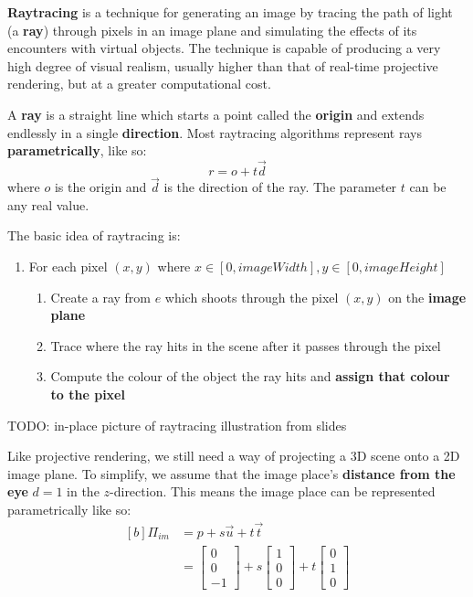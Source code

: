 \documentclass{article}
\begin{document}
\textbf{Raytracing} is a technique for generating an image by tracing the path of light (a \textbf{ray}) through pixels in an image plane and simulating the effects of its encounters with virtual objects. The technique is capable of producing a very high degree of visual realism, usually higher than that of real-time projective rendering, but at a greater computational cost.

A \textbf{ray} is a straight line which starts a point called the \textbf{origin} and extends endlessly in a single \textbf{direction}. Most raytracing algorithms represent rays \textbf{parametrically}, like so:
\begin{equation}
	r = o + t\vec{d}
	\label{eq:parametric-ray}
\end{equation}
where $o$ is the origin and $\vec{d}$ is the direction of the ray. The parameter $t$ can be any real value.

The basic idea of raytracing is:
\begin{enumerate}
	\item For each pixel $(x, y)$ where $x \in [0, imageWidth], y \in [0, imageHeight]$
	\begin{enumerate}
		\item Create a ray from $e$ which shoots through the pixel $(x, y)$ on the \textbf{image plane}
		\item Trace where the ray hits in the scene after it passes through the pixel
		\item Compute the colour of the object the ray hits and \textbf{assign that colour to the pixel}
	\end{enumerate}
\end{enumerate}

TODO: in-place picture of raytracing illustration from slides

Like projective rendering, we still need a way of projecting a 3D scene onto a 2D image plane. To simplify, we assume that the image place's \textbf{distance from the eye} $d = 1$ in the $z$-direction. This means the image place can be represented parametrically like so:
\begin{equation}
\begin{aligned}[b]
	\Pi_{im} &= p + s\vec{u} + t\vec{t} \\
	&= \left[ \begin{matrix} 0 \\ 0 \\ -1 \end{matrix} \right]
	+ s \left[ \begin{matrix} 1 \\ 0 \\ 0 \end{matrix} \right]
	+ t \left[ \begin{matrix} 0 \\ 1 \\ 0 \end{matrix} \right]
	\label{eq:parametric-raytracing-image-plane}
\end{aligned}
\end{equation}
\end{document}
